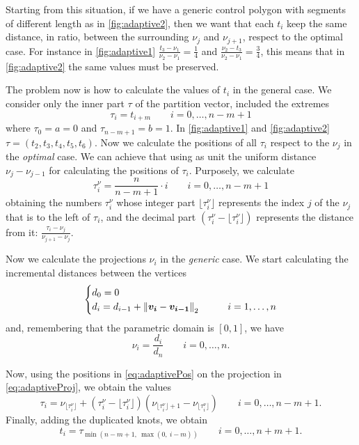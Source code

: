 \documentclass[dissertation.tex]{subfiles}
\begin{document}
Starting from this situation, if
we have a generic control polygon with segments of different length as
in \cref{fig:adaptive2}, then we want that each $t_i$ keep the same
distance, in ratio, between the surrounding $\nu_j$ and $\nu_{j+1}$,
respect to the optimal case. For instance in \cref{fig:adaptive1}
$\frac{t_3-\nu_1}{\nu_2-\nu_1}=\frac{1}{4}$ and
$\frac{\nu_2-t_3}{\nu_2-\nu_1}=\frac{3}{4}$, this means that in
\cref{fig:adaptive2} the same values must be preserved.

The problem now is how to calculate the values of $t_i$ in the general
case. We consider only the inner part $\tau$ of the partition vector,
included the extremes
\begin{equation*}
  \tau_i = t_{i+m}\qquad i=0,\dots,n-m+1
\end{equation*}
where $\tau_0=a=0$ and $\tau_{n-m+1}=b=1$. In \cref{fig:adaptive1} and
\cref{fig:adaptive2}
$\tau=(t_2,t_3,t_4,t_5,t_6)$. Now we calculate the positions of all
$\tau_i$ respect to the $\nu_j$ in the \emph{optimal} case. We can
achieve that using as unit the uniform distance $\nu_j-\nu_{j-1}$ for
calculating the positions of $\tau_i$. Purposely, we calculate
\begin{equation}\label{eq:adaptivePos}
  \tau_i^\nu=\frac{n}{n-m+1}\cdot i\qquad i=0,\dots,n-m+1
\end{equation}
obtaining the numbers $\tau_i^\nu$ whose integer part
$\lfloor\tau_i^\nu\rfloor$ represents the index $j$ of the
$\nu_j$ that is to the left of $\tau_i$, and the decimal part
$(\tau_i^\nu-\lfloor\tau_i^\nu\rfloor)$ represents the distance from
it: $\frac{\tau_i-\nu_j}{\nu_{j+1}-\nu_j}$.

Now we calculate the projections $\nu_i$ in the
\emph{generic} case.
We start calculating the incremental distances between
the vertices
\begin{equation*}
  \begin{cases}
    d_0=0&\\
    d_i=d_{i-1}+\left\lVert\boldsymbol{v_i}-\boldsymbol{v_{i-1}}\right\rVert_2&\qquad i=1,\dots,n
  \end{cases}
\end{equation*}
and, remembering that the parametric domain is $[0,1]$, we have
\begin{equation}\label{eq:adaptiveProj}
  \nu_i=\frac{d_i}{d_n}\qquad i=0,\dots,n.
\end{equation}

Now, using the positions in \cref{eq:adaptivePos} on the projection in
\cref{eq:adaptiveProj}, we obtain the values
\begin{equation*}
  \tau_i=\nu_{\lfloor\tau_i^\nu\rfloor}+(\tau_i^\nu-\lfloor\tau_i^\nu\rfloor)(\nu_{\lfloor\tau_i^\nu\rfloor+1}-\nu_{\lfloor\tau_i^\nu\rfloor})\qquad i=0,\dots,n-m+1.
\end{equation*}
Finally, adding the duplicated knots, we obtain
\begin{equation*}
  t_i=\tau_{\min(n-m+1,\ \max(0,\ i-m))}\qquad i=0,\dots,n+m+1.
\end{equation*}
\end{document}
